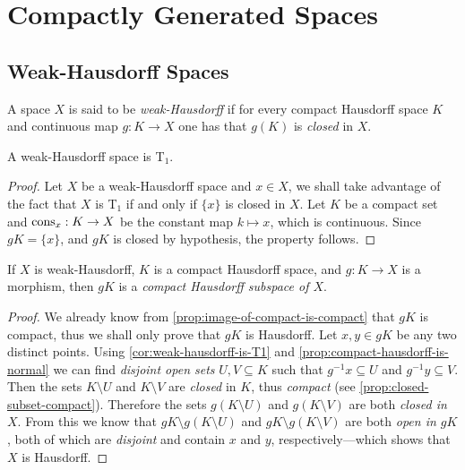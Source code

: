 \section{Compactly Generated Spaces}

\subsection{Weak-Hausdorff Spaces}

\begin{definition}
    \label{def:weak-hausdorff}
    A space \(X\) is said to be \emph{weak-Hausdorff} if for every compact Hausdorff
    space \(K\) and continuous map \(g: K \to X\) one has that \(g(K)\) is
    \emph{closed} in \(X\).
\end{definition}

\begin{corollary}
    \label{cor:weak-hausdorff-is-T1}
    A weak-Hausdorff space is T\(_1\).
\end{corollary}

\begin{proof}
    Let \(X\) be a weak-Hausdorff space and \(x \in X\), we shall take advantage of
    the fact that \(X\) is T\(_1\) if and only if \(\{x\}\) is closed in \(X\). Let
    \(K\) be a compact set and \(\operatorname{cons}_x: K \to X\) be the constant map \(k \mapsto
    x\), which is continuous. Since \(g K = \{x\}\), and \(g K\) is closed by
    hypothesis, the property follows.
\end{proof}

\begin{lemma}
    \label{lem:weak-haudorff-has-compact-hausdorff-subspace}
    If \(X\) is weak-Hausdorff, \(K\) is a compact Hausdorff space, and
    \(g: K \to X\) is a morphism, then \(g K\) is a \emph{compact Hausdorff subspace
        of \(X\)}.
\end{lemma}

\begin{proof}
    We already know from \cref{prop:image-of-compact-is-compact} that \(g K\) is
    compact, thus we shall only prove that \(g K\) is Hausdorff. Let
    \(x, y \in g K\) be any two distinct points. Using
    \cref{cor:weak-hausdorff-is-T1} and \cref{prop:compact-hausdorff-is-normal} we
    can find \emph{disjoint open sets} \(U, V \subseteq K\) such that
    \(g^{-1}x \subseteq U\) and \(g^{-1}y \subseteq V\). Then the sets
    \(K \setminus U\) and \(K \setminus V\) are \emph{closed} in \(K\), thus
    \emph{compact} (see \cref{prop:closed-subset-compact}). Therefore the sets
    \(g(K \setminus U)\) and \(g(K \setminus V)\) are both \emph{closed in
        \(X\)}. From this we know that \(g K \setminus g(K \setminus U)\) and
    \(g K \setminus g(K \setminus V)\) are both \emph{open in \(g K\)}, both of
    which are \emph{disjoint} and contain \(x\) and \(y\), respectively---which
    shows that \(X\) is Hausdorff.
\end{proof}


